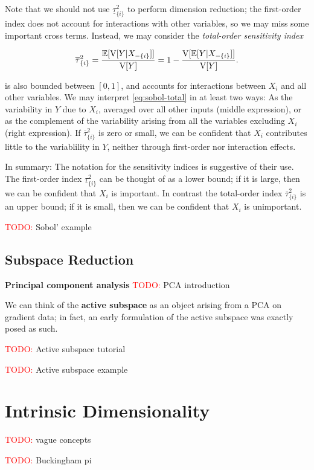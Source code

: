\documentclass{article}
\begin{document}
Note that we should not use \(\underline{\tau}_{\{i\}}^2\) to perform dimension
reduction; the first-order index does not account for interactions with other
variables, so we may miss some important cross terms. Instead, we may consider
the \emph{total-order sensitivity index}

\begin{equation}\label{eq:sobol-total}
  \overline{\tau}_{\{i\}}^2 = \frac{\E[\V[Y|X_{-\{i\}}]]}{\V[Y]} = %
  1 - \frac{\V[\E[Y|X_{-\{i\}}]]}{\V[Y]}.
\end{equation}

\noindent {} is also bounded between \([0,1]\), and accounts
for interactions between \(X_i\) and all other variables. We may interpret
\eqref{eq:sobol-total} in at least two ways: As the variability in \(Y\) due to
\(X_i\), averaged over all other inputs (middle expression), or as the complement
of the variability arising from all the variables excluding \(X_i\) (right
expression). If \(\overline{\tau}_{\{i\}}^2\) is zero or small, we can be
confident that \(X_i\) contributes little to the variablility in \(Y\), neither
through first-order nor interaction effects.

In summary: The notation for the sensitivity indices is suggestive of their use.
The first-order index \(\underline{\tau}_{\{i\}}^2\) can be thought of as a
lower bound; if it is large, then we can be confident that \(X_i\) is important.
In contrast the total-order index \(\overline{\tau}_{\{i\}}^2\) is an upper
bound; if it is small, then we can be confident that \(X_i\) is unimportant.

\textcolor{red}{TODO:} Sobol' example

\subsection{Subspace Reduction}
\textbf{Principal component analysis} \textcolor{red}{TODO:} PCA introduction

We can think of the \textbf{active subspace} as an object arising from a PCA on
gradient data; in fact, an early formulation of the active subspace was exactly
posed as such.\cite{russi2010uncertainty}

\textcolor{red}{TODO:} Active subspace tutorial

\textcolor{red}{TODO:} Active subspace example

\section{Intrinsic Dimensionality}

\textcolor{red}{TODO:} vague concepts

\textcolor{red}{TODO:} Buckingham pi



\end{document}
